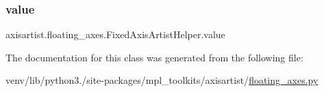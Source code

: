 \subsubsection{\texorpdfstring{value}{value}}
{\footnotesize\ttfamily axisartist.\+floating\+\_\+axes.\+Fixed\+Axis\+Artist\+Helper.\+value}



The documentation for this class was generated from the following file\+:\begin{DoxyCompactItemize}
\item 
venv/lib/python3./site-\/packages/mpl\+\_\+toolkits/axisartist/\hyperlink{axisartist_2floating__axes_8py}{floating\+\_\+axes.\+py}\end{DoxyCompactItemize}
